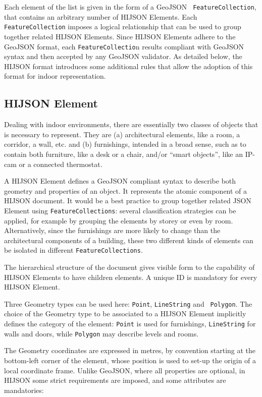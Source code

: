 Each element of the list is given in the form of a GeoJSON {\tt
FeatureCollection}, that contains an arbitrary  number of HIJSON Elements.
Each {\tt FeatureCollection} imposes a logical relationship that can be used
to group together related HIJSON Elements. Since  HIJSON Elements adhere to
the GeoJSON format, each {\tt FeatureCollectio}n results compliant with GeoJSON
syntax and then accepted by any GeoJSON validator. As detailed below, the
HIJSON format  introduces some additional rules that allow the adoption of
this format for indoor representation.


\subsection{HIJSON Element}

Dealing with indoor environments, there are essentially two classes of objects
that is necessary to represent. They are (a) architectural elements, like a
room, a corridor, a wall, etc. and (b) furnishings, intended in a broad sense,
such as to contain both furniture, like a desk or a chair, and/or ``smart objects'',
like an IP-cam or a connected thermostat.

A HIJSON Element defines a GeoJSON compliant syntax to describe both geometry and properties of
an object. It represents the atomic component of a HIJSON document. 
It would be a best practice to group
together related JSON Element using {\tt FeatureCollections}: several classification strategies
can be applied, for example by grouping the elements by storey or even by room.
Alternatively, since the furnishings are more likely to change than the
architectural components of a building, these two different kinds of elements
can be isolated in different {\tt FeatureCollections}.

The hierarchical structure of the document gives visible form to the capability of HIJSON Elements to have children elements. A unique ID is mandatory for every HIJSON Element. 

Three Geometry types can be used here: {\tt Point}, {\tt LineString}  and {\tt
Polygon}. The choice of the Geometry type to be associated to a HIJSON Element
implicitly defines the category of the element: {\tt Point} is used for
furnishings, {\tt LineString} for walls and doors, while {\tt Polygon} may
describe levels and rooms.

The Geometry coordinates are expressed in metres, by convention starting at
the bottom-left corner of the element, whose position is used to set-up the
origin of a local coordinate frame. Unlike GeoJSON, where all properties are
optional, in HIJSON some strict requirements are imposed, and some attributes
are mandatories:

